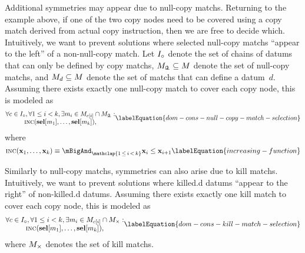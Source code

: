Additional symmetries may appear due to \glspl{null-copy match}.
%
Returning to the example above, if one of the two \glspl{copy node} need to be
covered using a \gls{copy match} derived from actual copy \gls{instruction},
then we are free to decide which.
%
Intuitively, we want to prevent \glspl{solution} where selected \glspl{null-copy
  match} ``appear to the left'' of a non-\gls{null-copy match}.
%
Let $\mInterchDataSet[\mCopy]$ denote the set of chains of \glspl{datum} that
can only be defined by \glspl{copy match}, \mbox{$\mNullCopyMatchSet \subseteq
  \mMatchSet$} denote the set of \glspl{null-copy match}, and
\mbox{$\mMatchSet[d] \subseteq \mMatchSet$} denote the set of \glspl{match} that
can define a \gls{datum}~$d$.
%
Assuming there exists exactly one \gls{null-copy match} to cover each \gls{copy
  node}, this is modeled as
%
\begin{equation}
  \begin{array}{@{}c@{}}
    \forall c \in \mInterchDataSet[\mCopy],
    \forall 1 \leq i < k,
    \exists m_i \in \mMatchSet[c[i]] \cap \mNullCopyMatchSet : \\
    \mIncreasing(\mVar{sel}[m_1], \ldots, \mVar{sel}[m_k]),
  \end{array}
  \labelEquation{dom-cons-null-copy-match-selection}
\end{equation}
%
where
%
\begin{equation}
  \mIncreasing(\mVar{x}_1, \ldots, \mVar{x}_k)
  \equiv
  \mBigAnd_{\mathclap{1 \,\leq\, i \,<\, k}}
  \mVar{x}_{i} \leq \mVar{x}_{i + 1}
  \labelEquation{increasing-function}
\end{equation}

Similarly to \glspl{null-copy match}, symmetries can also arise due to
\glspl{kill match}.
%
Intuitively, we want to prevent \glspl{solution} where \gls{killed.d}
\glspl{datum} ``appear to the right'' of non-\gls{killed.d} \glspl{datum}.
%
Assuming there exists exactly one \gls{kill match} to cover each \gls{copy
  node}, this is modeled as
%
\begin{equation}
  \begin{array}{@{}c@{}}
    \forall c \in \mInterchDataSet[\mCopy],
    \forall 1 \leq i < k,
    \exists m_i \in \mMatchSet[c[i]] \cap \mKillMatchSet : \\
    \mIncreasing(\mVar{sel}[m_1], \ldots, \mVar{sel}[m_k]),
  \end{array}
  \labelEquation{dom-cons-kill-match-selection}
\end{equation}
%
where $\mKillMatchSet$ denotes the set of \glspl{kill match}.


